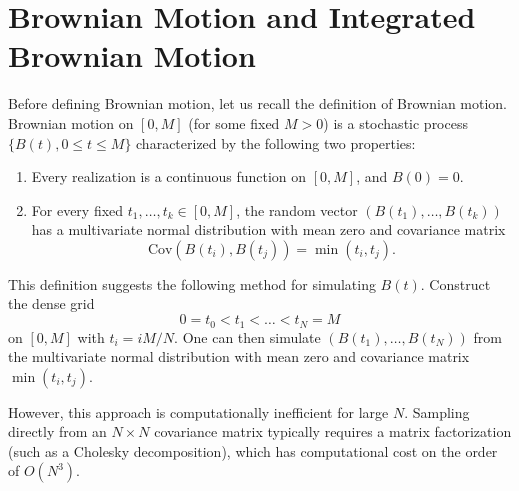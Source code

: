 \documentclass{scrartcl}
\begin{document}
\section{Brownian Motion and Integrated Brownian Motion}
Before defining Brownian motion, let us recall the definition of
Brownian motion. Brownian motion on $[0, M]$ (for some fixed $M > 0$)
is a stochastic process $\{B(t), 0 \le t \le M\}$ characterized by the
following two properties:

\begin{enumerate}
\item Every realization is a continuous function on $[0,M]$, and
  $B(0) = 0$.

\item For every fixed $t_1,\dots,t_k \in [0,M]$, the random vector
  $(B(t_1),\dots,B(t_k))$ has a multivariate normal distribution with
  mean zero and covariance matrix
  \[
  \text{Cov}(B(t_i), B(t_j)) = \min(t_i,t_j).
  \]
\end{enumerate}

This definition suggests the following method for simulating
$B(t)$. Construct the dense grid
\[
0 = t_0 < t_1 < \dots < t_N = M
\]
on $[0,M]$ with $t_i = iM/N$. One can then simulate
$(B(t_1),\dots,B(t_N))$ from the multivariate normal distribution with
mean zero and covariance matrix $\min(t_i,t_j)$.

However, this approach is computationally inefficient for large $N$.
Sampling directly from an $N \times N$ covariance matrix typically
requires a matrix factorization (such as a Cholesky decomposition),
which has computational cost on the order of $O(N^3)$.
\end{document}
